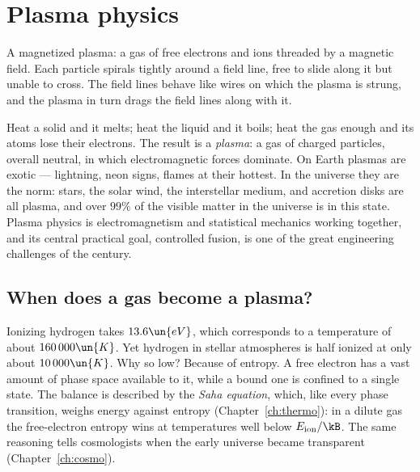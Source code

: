 \chapter{Plasma physics}
\label{ch:plasma}



\begin{prototype}
A magnetized plasma: a gas of free electrons and ions threaded by a magnetic field. Each particle spirals tightly around a field line, free to slide along it but unable to cross. The field lines behave like wires on which the plasma is strung, and the plasma in turn drags the field lines along with it.
\end{prototype}

Heat a solid and it melts; heat the liquid and it boils; heat the gas enough and its atoms lose their electrons. The result is a \emph{plasma}: a gas of charged particles, overall neutral, in which electromagnetic forces dominate. On Earth plasmas are exotic --- lightning, neon signs, flames at their hottest. In the universe they are the norm: stars, the solar wind, the interstellar medium, and accretion disks are all plasma, and over $99\%$ of the visible matter in the universe is in this state. Plasma physics is electromagnetism and statistical mechanics working together, and its central practical goal, controlled fusion, is one of the great engineering challenges of the century.

\section{When does a gas become a plasma?}

Ionizing hydrogen takes $13.6\un{eV}$, which corresponds to a temperature of about $160\,000\un{K}$. Yet hydrogen in stellar atmospheres is half ionized at only about $10\,000\un{K}$. Why so low? Because of entropy. A free electron has a vast amount of phase space available to it, while a bound one is confined to a single state. The balance is described by the \emph{Saha equation}, which, like every phase transition, weighs energy against entropy (Chapter~\ref{ch:thermo}): in a dilute gas the free-electron entropy wins at temperatures well below $E_{\text{ion}}/\kB$. The same reasoning tells cosmologists when the early universe became transparent (Chapter~\ref{ch:cosmo}).

